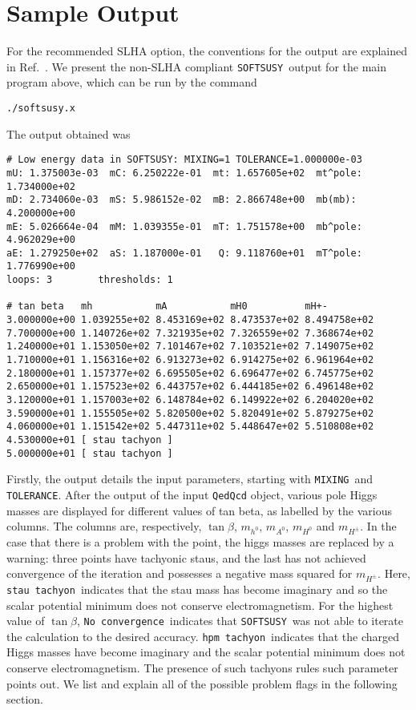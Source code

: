 \documentclass[]{article}
\def\SOFTSUSY{{\tt SOFTSUSY}}
\def\code#1{\small{\tt #1}\normalsize}
\begin{document}
\section{Sample Output \label{sec:output}}
For the recommended SLHA option, the conventions for the output are 
explained in Ref.~\cite{lhacc}. 
We present the non-SLHA compliant \SOFTSUSY~output 
for the main program above, which can be run by the command
\small\begin{verbatim} 
./softsusy.x
\end{verbatim}\normalsize
The output obtained was
\small\begin{verbatim}
# Low energy data in SOFTSUSY: MIXING=1 TOLERANCE=1.000000e-03
mU: 1.375003e-03  mC: 6.250222e-01  mt: 1.657605e+02  mt^pole: 1.734000e+02
mD: 2.734060e-03  mS: 5.986152e-02  mB: 2.866748e+00  mb(mb):  4.200000e+00
mE: 5.026664e-04  mM: 1.039355e-01  mT: 1.751578e+00  mb^pole: 4.962029e+00
aE: 1.279250e+02  aS: 1.187000e-01   Q: 9.118760e+01  mT^pole: 1.776990e+00
loops: 3        thresholds: 1

# tan beta   mh           mA           mH0          mH+-
3.000000e+00 1.039255e+02 8.453169e+02 8.473537e+02 8.494758e+02
7.700000e+00 1.140726e+02 7.321935e+02 7.326559e+02 7.368674e+02
1.240000e+01 1.153050e+02 7.101467e+02 7.103521e+02 7.149075e+02
1.710000e+01 1.156316e+02 6.913273e+02 6.914275e+02 6.961964e+02
2.180000e+01 1.157377e+02 6.695505e+02 6.696477e+02 6.745775e+02
2.650000e+01 1.157523e+02 6.443757e+02 6.444185e+02 6.496148e+02
3.120000e+01 1.157003e+02 6.148784e+02 6.149922e+02 6.204020e+02
3.590000e+01 1.155505e+02 5.820500e+02 5.820491e+02 5.879275e+02
4.060000e+01 1.151542e+02 5.447311e+02 5.448647e+02 5.510808e+02
4.530000e+01 [ stau tachyon ]
5.000000e+01 [ stau tachyon ]
\end{verbatim}\normalsize

Firstly, the output details the input parameters, starting with
\code{MIXING}~and \code{TOLERANCE}.  
After the output of the input \code{QedQcd} object,
various pole Higgs masses are displayed for different values of tan beta, as
labelled by the various columns. The columns are, respectively, 
$\tan \beta$, $m_{h^0}$, $m_{A^0}$, $m_{H^0}$ and $m_{H^\pm}$.
In the case that there is a problem with the point, the higgs masses are
replaced by a warning: three points have tachyonic staus, and the last has
not achieved convergence of the iteration and possesses a negative mass
squared for $m_{H^\pm}$. Here, \code{stau tachyon}~indicates that the
stau mass has become imaginary and so the scalar potential minimum does not 
conserve electromagnetism. For the highest value of $\tan \beta$, \code{No
  convergence}~indicates that \SOFTSUSY~was not able to iterate the
calculation to the desired accuracy. \code{hpm tachyon}~indicates that the
charged Higgs masses have become imaginary and the scalar potential minimum
does not conserve electromagnetism. The presence of such tachyons rules such
parameter points out.  
We list and explain all of the possible problem flags in 
the following section.
\end{document}
